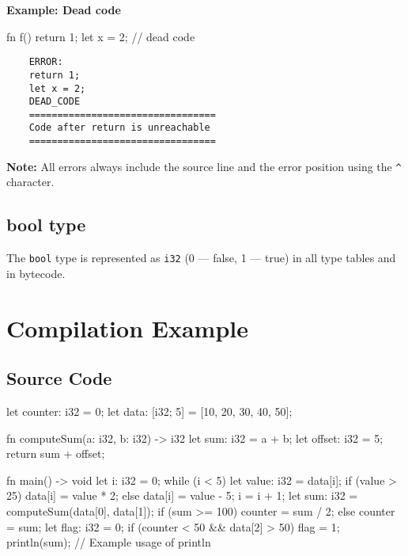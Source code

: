 \documentclass[a4paper,12pt]{article}
\begin{document}
    \textbf{Example: Dead code}
    \begin{snailcode}
    fn f() {
        return 1;
        let x = 2; // dead code
    }
    \end{snailcode}
    \begin{verbatim}
    ERROR:
    return 1;
    let x = 2;
    DEAD_CODE
    =================================
    Code after return is unreachable
    =================================
    \end{verbatim}

    \textbf{Note:} All errors always include the source line and the error position using the \texttt{^} character.

    \subsection*{bool type}
    The \texttt{bool} type is represented as \texttt{i32} (0 --- false, 1 --- true) in all type tables and in bytecode.

    \section{Compilation Example}
    \subsection{Source Code}
    \begin{snailcode}
    let counter: i32 = 0;
    let data: [i32; 5] = [10, 20, 30, 40, 50];

    fn computeSum(a: i32, b: i32) -> i32 {
    let sum: i32 = a + b;
    let offset: i32 = 5;
    return sum + offset;
    }

    fn main() -> void {
    let i: i32 = 0;
    while (i < 5) {
    let value: i32 = data[i];
    if (value > 25) {
    data[i] = value * 2;
    } else {
    data[i] = value - 5;
    }
    i = i + 1;
    }
    let sum: i32 = computeSum(data[0], data[1]);
    if (sum >= 100) {
    counter = sum / 2;
    } else {
    counter = sum;
    }
    let flag: i32 = 0;
    if (counter < 50 && data[2] > 50) {
    flag = 1;
    }
    println(sum); // Example usage of println
    }
    \end{snailcode}
\end{document}
